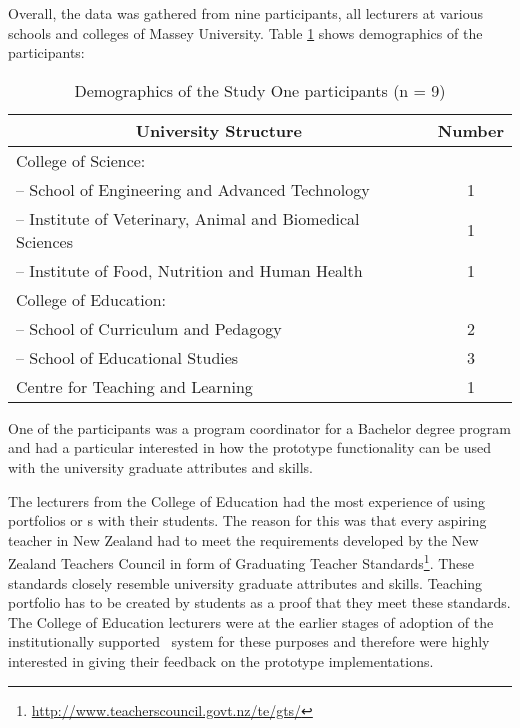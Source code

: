 Overall, the data was gathered from nine participants, all lecturers at
various schools and colleges of Massey University. Table \ref{tab:study1part}
shows demographics of the participants:

\begin{table}[htb]
\setlength{\abovecaptionskip}{0pt}
\caption{Demographics of the Study One participants (n = 9)}
  \begin{center}
    \begin{tabular}{| l | c |}
    \hline
     \multicolumn{1}{|c|}{\textbf{University Structure}} &
     \multicolumn{1}{c|}{\textbf{Number}} \\ \hline
		College of Science: & \\ 
		-- School of Engineering and Advanced Technology & 1 \\
		-- Institute of Veterinary, Animal and Biomedical Sciences & 1 \\
		-- Institute of Food, Nutrition and Human Health & 1 \\ \hline
		College of Education: & \\ 
		-- School of Curriculum and Pedagogy & 2 \\
		-- School of Educational Studies &  3 \\ \hline
		Centre for Teaching and Learning & 1 \\ \hline
	\end{tabular}
  \end{center}
\label{tab:study1part}
\end{table}

One of the participants was a program coordinator for a Bachelor degree program
and had a particular interested in how the prototype functionality can be used
with the university graduate attributes and \LLLs skills.

The lecturers from the College of Education had the most experience of using
portfolios or \ep s with their students. The reason for this was that every
aspiring teacher in New Zealand had to meet the requirements developed by the
New Zealand Teachers Council in form of Graduating Teacher
Standards\footnote{\url{http://www.teacherscouncil.govt.nz/te/gts/}}. These
standards closely resemble university graduate attributes and \LLLs skills.
Teaching portfolio has to be created by students as a proof that they meet these
standards. The College of Education lecturers were at the earlier stages of
adoption of the institutionally supported \ep~system for these purposes and
therefore were highly interested in giving their feedback on the prototype
implementations.


